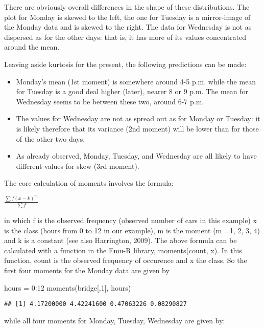 \documentclass[
]{book}
\newenvironment{Shaded}{\begin{snugshade}}{\end{snugshade}}
\newcommand{\DecValTok}[1]{\textcolor[rgb]{0.00,0.00,0.81}{#1}}
\newcommand{\FunctionTok}[1]{\textcolor[rgb]{0.00,0.00,0.00}{#1}}
\newcommand{\NormalTok}[1]{#1}
\newcommand{\OtherTok}[1]{\textcolor[rgb]{0.56,0.35,0.01}{#1}}
\newcommand{\SpecialCharTok}[1]{\textcolor[rgb]{0.00,0.00,0.00}{#1}}
\begin{document}
There are obviously overall differences in the shape of these distributions. The
plot for Monday is skewed to the left, the one for Tuesday is a mirror-image of
the Monday data and is skewed to the right. The data for Wednesday is not as
dispersed as for the other days: that is, it has more of its values concentrated
around the mean.

Leaving aside kurtosis for the present, the following predictions can be made:

\begin{itemize}
\item
  Monday's mean (1st moment) is somewhere around 4-5 p.m. while the mean for
  Tuesday is a good deal higher (later), nearer 8 or 9 p.m. The mean for Wednesday
  seems to be between these two, around 6-7 p.m.
\item
  The values for Wednesday are not as spread out as for Monday or Tuesday: it is
  likely therefore that its variance (2nd moment) will be lower than for those of
  the other two days.
\item
  As already observed, Monday, Tuesday, and Wednesday are all likely to have
  different values for skew (3rd moment).
\end{itemize}

The core calculation of moments involves the formula:

\(\frac{\sum{f(x-k)^m}}{\sum{f}}\)

in which f is the observed frequency (observed number of cars in this example) x is the class (hours from 0 to 12 in our example), m is the moment (m =1, 2, 3, 4) and k is a constant (see also Harrington, 2009). The above formula can be calculated with a function in the Emu-R library, moments(count, x). In this function, count is the observed frequency of occurence and x the class. So the first four moments for the Monday data are given by

\begin{Shaded}
\begin{Highlighting}[]
\NormalTok{hours }\OtherTok{=} \DecValTok{0}\SpecialCharTok{:}\DecValTok{12}
\FunctionTok{moments}\NormalTok{(bridge[,}\DecValTok{1}\NormalTok{], hours)}
\end{Highlighting}
\end{Shaded}

\begin{verbatim}
## [1] 4.17200000 4.42241600 0.47063226 0.08290827
\end{verbatim}

while all four moments for Monday, Tuesday, Wednesday are given by:
\end{document}
